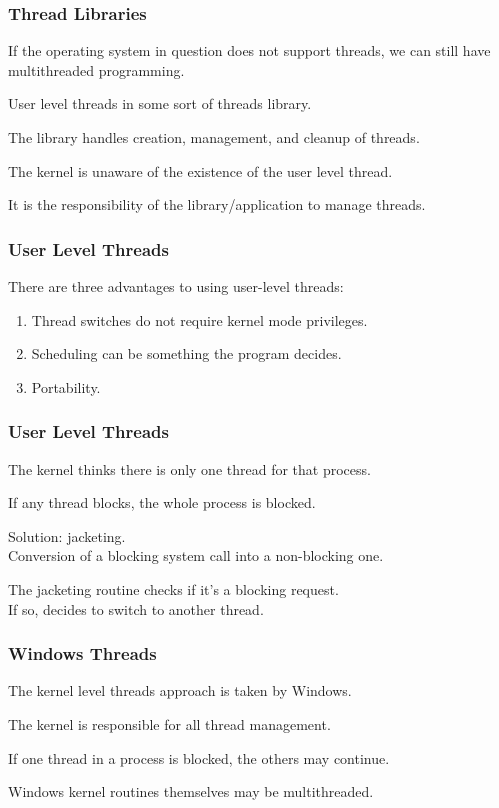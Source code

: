 \begin{frame}
\frametitle{Thread Libraries}

If the operating system in question does not support threads, we can still have multithreaded programming. 

User level threads in some sort of threads library. 

The library handles creation, management, and cleanup of threads. 

The kernel is unaware of the existence of the user level thread.

It is the responsibility of the library/application to manage threads. 


\end{frame}

\begin{frame}
\frametitle{User Level Threads}

There are three advantages to using user-level threads:
\begin{enumerate}
	\item Thread switches do not require kernel mode privileges.
	\item Scheduling can be something the program decides.
	\item Portability.
\end{enumerate}


\end{frame}

\begin{frame}
\frametitle{User Level Threads}
The kernel thinks there is only one thread for that process.

If any thread blocks, the whole process is blocked.

Solution: \alert{jacketing}.\\
\quad Conversion of a blocking system call into a non-blocking one.

The jacketing routine checks if it's a blocking request.\\
\quad If so, decides to switch to another thread.

\end{frame}

\begin{frame}
\frametitle{Windows Threads}

The kernel level threads approach is taken by Windows. 

The kernel is responsible for all thread management.

If one thread in a process is blocked, the others may continue. 

Windows kernel routines themselves may be multithreaded.

\end{frame}

